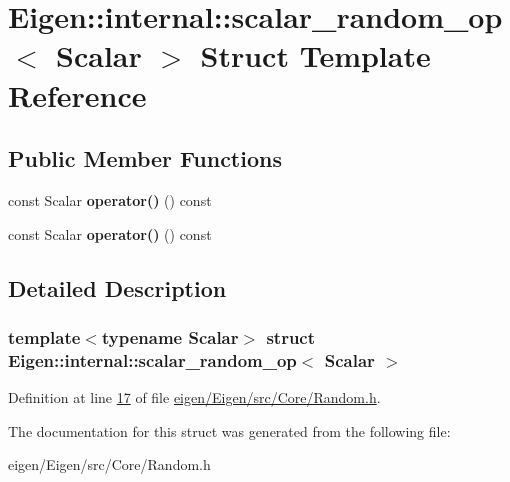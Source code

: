 \hypertarget{struct_eigen_1_1internal_1_1scalar__random__op}{}\section{Eigen\+:\+:internal\+:\+:scalar\+\_\+random\+\_\+op$<$ Scalar $>$ Struct Template Reference}
\label{struct_eigen_1_1internal_1_1scalar__random__op}
\subsection*{Public Member Functions}
\begin{DoxyCompactItemize}
\item 
\mbox{\label{struct_eigen_1_1internal_1_1scalar__random__op_a964c5cef167f29c4adec5025453dacc3}} 
const Scalar {\bfseries operator()} () const
\item 
\mbox{\label{struct_eigen_1_1internal_1_1scalar__random__op_a964c5cef167f29c4adec5025453dacc3}} 
const Scalar {\bfseries operator()} () const
\end{DoxyCompactItemize}


\subsection{Detailed Description}
\subsubsection*{template$<$typename Scalar$>$\newline
struct Eigen\+::internal\+::scalar\+\_\+random\+\_\+op$<$ Scalar $>$}



Definition at line \hyperlink{eigen_2_eigen_2src_2_core_2_random_8h_source_l00017}{17} of file \hyperlink{eigen_2_eigen_2src_2_core_2_random_8h_source}{eigen/\+Eigen/src/\+Core/\+Random.\+h}.



The documentation for this struct was generated from the following file\+:\begin{DoxyCompactItemize}
\item 
eigen/\+Eigen/src/\+Core/\+Random.\+h\end{DoxyCompactItemize}
